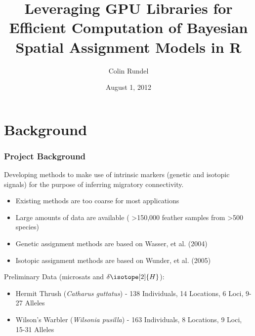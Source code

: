 \documentclass[slidestop,mathserif]{beamer}
\title[JSM 2012]{Leveraging GPU Libraries for Efficient Computation of Bayesian Spatial Assignment Models in R}
\author{Colin Rundel}
\date{August 1, 2012}
\institute[UCLA]{University of California, Los Angeles}
\begin{document}
\begin{frame}[plain]
\titlepage
\end{frame}


\section{Background}
\addtocounter{framenumber}{-1} 


\begin{frame}
\frametitle{Project Background}

Developing methods to make use of intrinsic markers (genetic and isotopic signals) for the purpose of inferring migratory connectivity.

\begin{itemize}
\item Existing methods are too coarse for most applications
\item Large amounts of data are available ( \textgreater{}150,000 feather samples from \textgreater{}500 species)
\item Genetic assignment methods are based on Wasser, et al. (2004)
\item Isotopic assignment methods are based on Wunder, et al. (2005)
\end{itemize}

\vspace{3mm}

Preliminary Data (microsats and $\delta \isotope[2]{H}$):
\begin{itemize}
\item Hermit Thrush (\textit{Catharus guttatus}) - 138 Individuals, 14 Locations, 6 Loci, 9-27 Alleles
\item Wilson's Warbler (\textit{Wilsonia pusilla}) - 163 Individuals, 8 Locations, 9 Loci, 15-31 Alleles
\end{itemize}


\end{frame}


\end{document}
